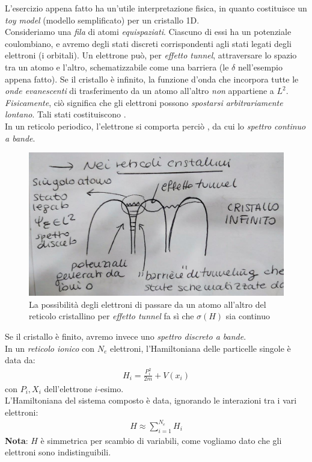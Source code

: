 \documentclass[../../FisicaTeorica.tex]{subfiles}
\begin{document}
L'esercizio appena fatto ha un'utile interpretazione fisica, in quanto costituisce un \textit{toy model} (modello semplificato) per un cristallo 1D.\\
Consideriamo una \textit{fila} di atomi \textit{equispaziati}. Ciascuno di essi ha un potenziale coulombiano, e avremo degli stati discreti corrispondenti agli stati legati degli elettroni (i  orbitali). Un elettrone può, per \textit{effetto tunnel}, attraversare lo spazio tra un atomo e l'altro, schematizzabile come una barriera (le $\delta$ nell'esempio appena fatto). Se il cristallo è infinito, la funzione d'onda che incorpora tutte le \textit{onde evanescenti} di trasferimento da un atomo all'altro \textit{non} appartiene a $L^2$. \textit{Fisicamente}, ciò significa che gli elettroni possono \textit{spostarsi arbitrariamente lontano}. Tali stati costituiscono .\\
In un reticolo periodico, l'elettrone si comporta perciò , da cui lo \textit{spettro continuo a bande}.\\
\begin{figure}[H]
\centering
\includegraphics[scale=0.4]{Immagini/13_12/image004.jpg}
\caption{La possibilità degli elettroni di passare da un atomo all'altro del reticolo cristallino per \textit{effetto tunnel} fa sì che $\sigma(H)$ sia continuo}
\end{figure}
Se il cristallo è finito, avremo invece uno \textit{spettro discreto a bande}.\\
In un \textit{reticolo ionico} con $N_e$ elettroni, l'Hamiltoniana delle particelle singole è data da:
\begin{align*}
H_i = \frac{P_i^2}{2m} + V(x_i)
\end{align*}
con $P_i, X_i$ dell'elettrone $i$-esimo.\\
L'Hamiltoniana del sistema composto è data, ignorando le interazioni tra i vari elettroni:
\begin{align*}
H \approx \sum_{i=1}^{N_e} H_i
\end{align*}
\textbf{Nota}: $H$ è simmetrica per scambio di variabili, come vogliamo dato che gli elettroni sono indistinguibili.\\
\end{document}
